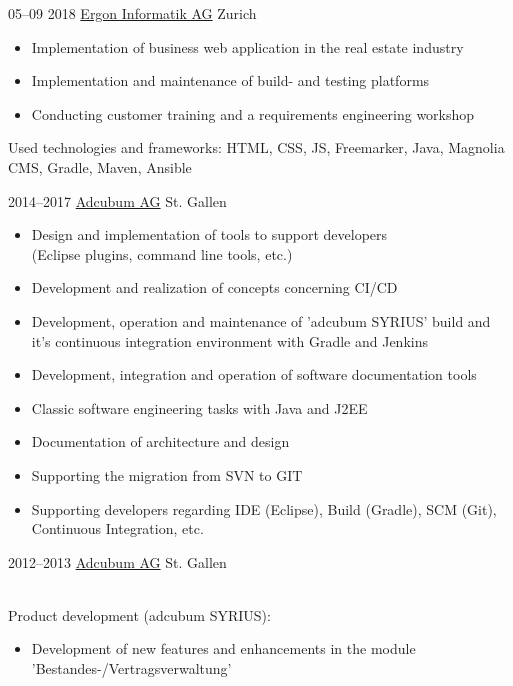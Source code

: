 \documentclass[]{cv-style}
\begin{document}
\begin{entrylist}
\entry
  {05--09 2018}
  {\href{https://www.ergon.ch}{Ergon Informatik AG}}
  {Zurich}
  {
  \begin{itemize}
  	\item Implementation of business web application in the real estate industry
  	\item Implementation and maintenance of build- and testing platforms
  	\item Conducting customer training and a requirements engineering workshop
  \end{itemize}
  Used technologies and frameworks: HTML, CSS, JS, Freemarker, Java, Magnolia CMS, Gradle, Maven, Ansible}
\entry
  {2014--2017}
  {\href{https://www.adcubum.com}{Adcubum AG}}
  {St. Gallen}
  {
  \begin{itemize}
    \item Design and implementation of tools to support developers \\(Eclipse plugins, command line tools, etc.)
    \item Development and realization of concepts concerning CI/CD
    \item Development, operation and maintenance of 'adcubum SYRIUS' build and it's continuous integration environment with Gradle and Jenkins
    \item Development, integration and operation of software documentation tools
    \item Classic software engineering tasks with Java and J2EE
    \item Documentation of architecture and design
    \item Supporting the migration from SVN to GIT
    \item Supporting developers regarding IDE (Eclipse), Build (Gradle), SCM (Git), Continuous Integration, etc.
  \end{itemize}}
\entry
  {2012--2013}
  {\href{https://www.adcubum.com}{Adcubum AG}}
  {St. Gallen}
  {\\
  Product development (adcubum SYRIUS):
  \begin{itemize}
    \item Development of new features and enhancements in the module \\'Bestandes-/Vertragsverwaltung'

\end{itemize}}
\end{entrylist}
\end{document}

